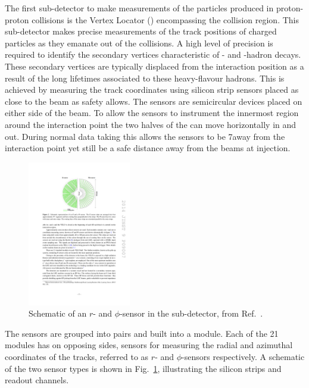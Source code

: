 The first sub-detector to make measurements of the particles produced in proton-proton collisions is the Vertex Locator (\velo) encompassing the collision region. This sub-detector makes precise measurements of the track positions of charged particles as they emanate out of the collisions. A high level of precision is required to identify the secondary vertices characteristic of \bquark- and \cquark-hadron decays. These secondary vertices are typically displaced from the interaction position as a result of the long lifetimes associated to these heavy-flavour hadrons. This is achieved by measuring the track coordinates using silicon strip sensors placed as close to the \lhc beam as safety allows. The \velo sensors are semicircular devices placed on either side of the beam. To allow the sensors to instrument the innermost region around the interaction point the two halves of the \velo can move horizontally in and out. During normal data taking this allows the sensors to be 7\mm away from the interaction point yet still be a safe distance away from the beams at injection. 

\begin{figure}[!h]
    \centering   
    \includegraphics[width=0.4\textwidth]{figs/Detector/velo_r_phi_sensor.pdf}
    \caption{Schematic of an $r$- and $\phi$-sensor in the \velo sub-detector, from Ref.~\cite{LHCb-DP-2014-001}.}
    \label{fig:Dec_r_phi_sensor}   
\end{figure}

The sensors are grouped into pairs and built into a module. Each of the 21 modules has on opposing sides, sensors for measuring the radial and azimuthal coordinates of the tracks, referred to as $r$- and $\phi$-sensors respectively. A schematic of the two sensor types is shown in Fig.~\ref{fig:Dec_r_phi_sensor}, illustrating the silicon strips and readout channels. 


